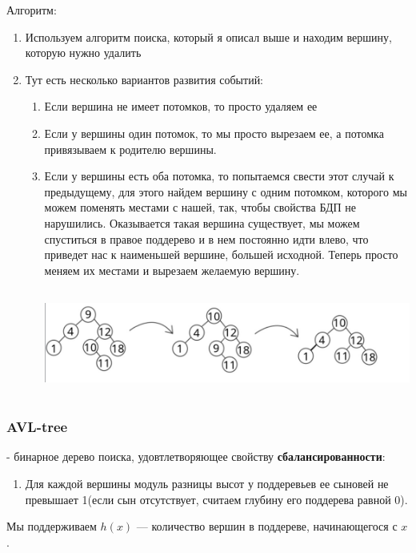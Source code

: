 \begin{enumerate}
    Алгоритм:
    \begin{enumerate}
        \item Используем алгоритм поиска, который я описал выше и находим вершину, которую нужно удалить
        \item Тут есть несколько вариантов развития событий:
        \begin{enumerate}
            \item Если вершина не имеет потомков, то просто удаляем ее
            \item Если у вершины один потомок, то мы просто вырезаем ее, а потомка привязываем к родителю вершины.
            \item Если у вершины есть оба потомка, то попытаемся свести этот случай к предыдущему, для этого найдем вершину с одним потомком, которого мы можем поменять местами с нашей, так, чтобы свойства БДП не нарушились. Оказывается такая вершина существует, мы можем спуститься в правое поддерево и в нем постоянно идти влево, что приведет нас к наименьшей вершине, большей исходной. Теперь просто меняем их местами и вырезаем желаемую вершину.
            \begin{center}
                \includegraphics[width=15cm, height=3.5cm]{assets/example1.jpg}
            \end{center}
        \end{enumerate}
    \end{enumerate}
\end{enumerate}
\subsubsection{AVL-tree}
 - бинарное дерево поиска, удовтлетворяющее свойству \textbf{сбалансированности}:
\begin{enumerate}
    \item [] Для каждой вершины модуль разницы высот у поддеревьев ее сыновей не превышает 1(если сын отсутствует, считаем глубину его поддерева равной 0). 
\end{enumerate}

Мы поддерживаем $h(x)$ --- количество вершин в поддереве, начинающегося с $x$.

